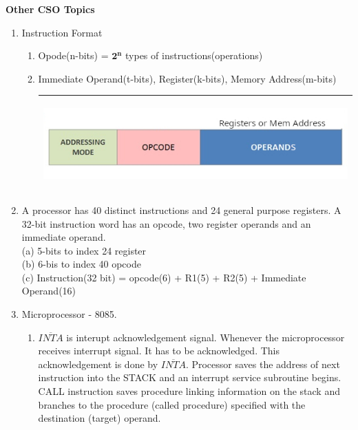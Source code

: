 
\centerline{\textbf{ \LARGE Other CSO Topics}}

\begin{enumerate}

    \item Instruction Format
    \begin{enumerate}
      \item Opode(n-bits) = { \large \(  \mathbf{ 2^n }\) } types of instructions(operations)
      \item Immediate Operand(t-bits), Register(k-bits), Memory Address(m-bits)

          \begin{myTableStyle} \begin{tabular}{ |m{14cm}| } \hline
             \begin{center} \includegraphics[scale=1]{./images/Instruction-Format.jpg} \end{center}\\ \hline
          \end{tabular} \end{myTableStyle} \vspace{0.08in}
    \end{enumerate}
    \item A processor has 40 distinct instructions and 24 general purpose registers.
             A 32-bit instruction word has an opcode, two register operands and an immediate operand.
             \\ (a) 5-bits to index 24 register
             \\ (b) 6-bis to index 40 opcode
             \\ (c) Instruction(32 bit) = opcode(6) + R1(5) + R2(5) + Immediate Operand(16)

    \item Microprocessor - 8085.
    \begin{enumerate}
        \item \( \overline{INTA} \)  is interupt acknowledgement signal. Whenever the microprocessor
              receives interrupt signal. It has to be acknowledged. This acknowledgement is done by
              \( \overline{INTA} \).  Processor saves the address of next instruction into the STACK
              and an interrupt service subroutine begins. CALL instruction saves procedure linking
              information on the stack and branches to the procedure (called procedure) specified
              with the destination (target) operand.


\end{enumerate}
\end{enumerate}
